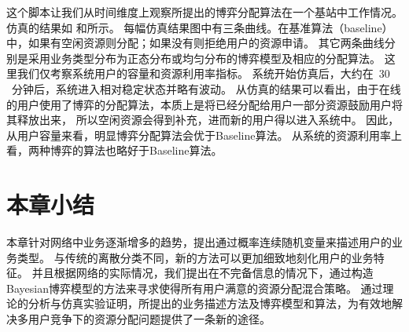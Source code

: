 这个脚本让我们从时间维度上观察所提出的博弈分配算法在一个基站中工作情况。
仿真的结果如  和所示。
每幅仿真结果图中有三条曲线。在基准算法（baseline）中，如果有空闲资源则分配；如果没有则拒绝用户的资源申请。
其它两条曲线分别是采用业务类型分布为正态分布或均匀分布的博弈模型及相应的分配算法。
这里我们仅考察系统用户的容量和资源利用率指标。
系统开始仿真后，大约在~$30$~分钟后，系统进入相对稳定状态并略有波动。
从仿真的结果可以看出，由于在线的用户使用了博弈的分配算法，本质上是将已经分配给用户一部分资源鼓励用户将其释放出来，
所以空闲资源会得到补充，进而新的用户得以进入系统中。
因此，从用户容量来看，明显博弈分配算法会优于Baseline算法。
从系统的资源利用率上看，两种博弈的算法也略好于Baseline算法。
\section{本章小结}
本章针对网络中业务逐渐增多的趋势，提出通过概率连续随机变量来描述用户的业务类型。
与传统的离散分类不同，新的方法可以更加细致地刻化用户的业务特征。
并且根据网络的实际情况，我们提出在不完备信息的情况下，通过构造Bayesian博弈模型的方法来寻求使得所有用户满意的资源分配混合策略。
通过理论的分析与仿真实验证明，所提出的业务描述方法及博弈模型和算法，为有效地解决多用户竞争下的资源分配问题提供了一条新的途径。


